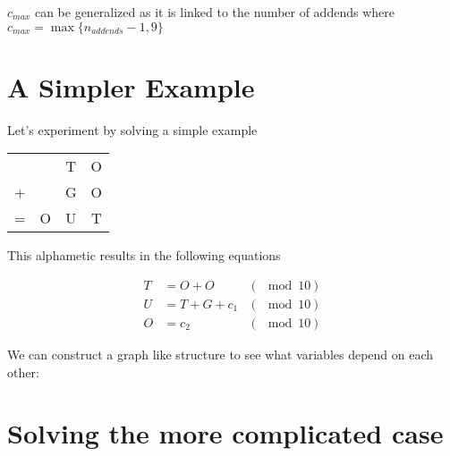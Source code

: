 \documentclass[a4paper,11pt]{article}
\begin{document}
$c_{max}$ can be generalized as it is linked to the number of addends where $c_{max} = \max\{n_{addends} - 1, 9\} $

\pagebreak
\section{A Simpler Example}
Let's experiment by solving a simple example 


\begin{center}
\begin{tabular}{ c c c c} 
   &   & T & O \\ 
 + &   & G & O \\
 \hline 
 = & O & U & T \\ 
 
\end{tabular}
\end{center}

This alphametic results in the following equations

\begin{align}
    T &= O + O       &(\mod 10) \label{eg:eq1} \\
    U &= T + G + c_1 &(\mod 10) \label{eq:eq2} \\
    O &=         c_2 &(\mod 10) \label{eq:eq3}
\end{align}

We can construct a graph like structure to see what variables depend on each other:

\begin{center}
\end{center}

\pagebreak
\section{Solving the more complicated case}
\end{document}
